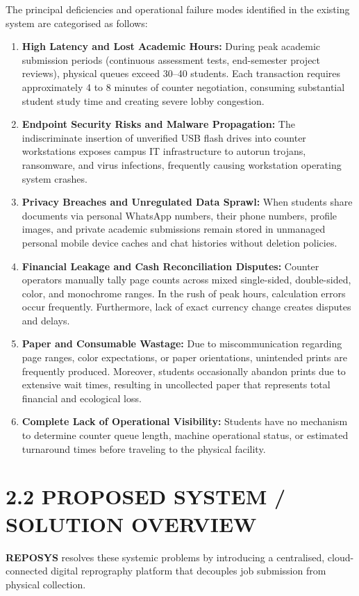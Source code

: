\documentclass[12pt,a4paper,oneside]{report}
\begin{document}
The principal deficiencies and operational failure modes identified in the existing system are categorised as follows:
\begin{enumerate}[leftmargin=0.35in, itemsep=2pt]
  \item \textbf{High Latency and Lost Academic Hours:} During peak academic submission periods (continuous assessment tests, end-semester project reviews), physical queues exceed 30--40 students. Each transaction requires approximately 4 to 8 minutes of counter negotiation, consuming substantial student study time and creating severe lobby congestion.
  \item \textbf{Endpoint Security Risks and Malware Propagation:} The indiscriminate insertion of unverified USB flash drives into counter workstations exposes campus IT infrastructure to autorun trojans, ransomware, and virus infections, frequently causing workstation operating system crashes.
  \item \textbf{Privacy Breaches and Unregulated Data Sprawl:} When students share documents via personal WhatsApp numbers, their phone numbers, profile images, and private academic submissions remain stored in unmanaged personal mobile device caches and chat histories without deletion policies.
  \item \textbf{Financial Leakage and Cash Reconciliation Disputes:} Counter operators manually tally page counts across mixed single-sided, double-sided, color, and monochrome ranges. In the rush of peak hours, calculation errors occur frequently. Furthermore, lack of exact currency change creates disputes and delays.
  \item \textbf{Paper and Consumable Wastage:} Due to miscommunication regarding page ranges, color expectations, or paper orientations, unintended prints are frequently produced. Moreover, students occasionally abandon prints due to extensive wait times, resulting in uncollected paper that represents total financial and ecological loss.
  \item \textbf{Complete Lack of Operational Visibility:} Students have no mechanism to determine counter queue length, machine operational status, or estimated turnaround times before traveling to the physical facility.
\end{enumerate}

\section{2.2 PROPOSED SYSTEM / SOLUTION OVERVIEW}
\textbf{REPOSYS} resolves these systemic problems by introducing a centralised, cloud-connected digital reprography platform that decouples job submission from physical collection.
\end{document}
